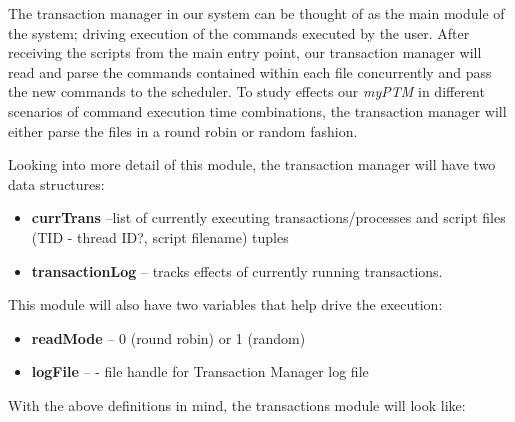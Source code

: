 The transaction manager in our system can be thought of as the main module of the system; driving execution of the commands executed by the user. After receiving the scripts from the main entry point, our transaction manager will read and parse the commands contained within each file concurrently and pass the new commands to the scheduler. To study effects our \textit{myPTM} in different scenarios of command execution time combinations, the transaction manager will either parse the files in a round robin or random fashion. 

Looking into more detail of this module, the transaction manager will have two data structures: 

\begin{itemize}
\item \textbf{currTrans} --list of currently executing transactions/processes and script files (TID - thread ID?, script filename) tuples
\item \textbf{transactionLog} --  tracks effects of currently running transactions.
\end{itemize}

This module will also have two variables that help drive the execution:

\begin{itemize}
\item \textbf{readMode} -- 0 (round robin) or 1 (random)
\item \textbf{logFile} --  - file handle for Transaction Manager log file
\end{itemize}

With the above definitions in mind, the transactions module will look like:\\

\noindent{}